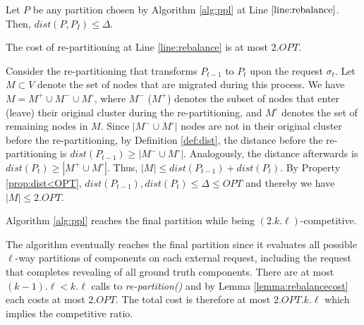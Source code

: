 
\begin{property} \label{prop:dist<OPT}
	Let $P$ be any partition chosen by Algorithm \ref{alg:ppl} at Line $\ref{line:rebalance}$.
	Then, $dist(P,P_I) \leq \Delta$.
\end{property}

\begin{lemma}	\label{lemma:rebalancecost}
	The cost of re-partitioning at Line \ref{line:rebalance} is at most $2.OPT$.
\end{lemma}
\begin{IEEEproof}
	Consider the re-partitioning that transforms $P_{t-1}$ to $P_t$ upon the request $\sigma_t$.
	Let $M \subset V$ denote the set of nodes that are migrated during this process.
	We have $M = M^+ \cup M^- \cup M^\circ$,
	where $M^-$ ($M^+$) denotes the subset of nodes that
	enter (leave) their original cluster during the re-partitioning,
	and $M^\circ$ denotes the set of remaining nodes in $M$.
	Since $|M^- \cup M^\circ|$ nodes are not in their original cluster before the re-partitioning,
	by Definition \ref{def:dist},
	the distance before the re-partitioning is $dist(P_{t-1}) \geq | M^- \cup M^\circ |$.
	Analogously,
	 the distance afterwards is $dist(P_{t}) \geq | M^+ \cup M^\circ |$.
	Thus,
	$|M| \leq dist(P_{t-1}) + dist(P_{t})$.
	By Property \ref{prop:dist<OPT},
	$dist(P_{t-1}) , dist(P_{t}) \leq \Delta \leq OPT$
	and thereby we have	
	$|M| \leq 2.OPT$.
\end{IEEEproof}

\begin{theorem}	\label{thm:upperbound}
	Algorithm \ref{alg:ppl} reaches the final partition while being $(2.k.\ell)$-competitive.
\end{theorem}
\begin{IEEEproof}
	The algorithm eventually reaches the final partition since it
	 evaluates all possible $\ell$-way partitions of components on each external request,
	including the request that completes revealing of all ground truth components.
	There are at most $(k-1).\ell < k.\ell $ calls to \emph{re-partition()} and by Lemma \ref{lemma:rebalancecost} each costs at most $2.OPT$.
	The total cost is therefore at most $2.OPT.k.\ell$ which implies the competitive ratio.
\end{IEEEproof}